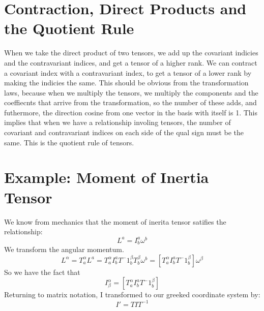 \documentclass[11pt,notitlepage]{article}
\begin{document}
\section{Contraction, Direct Products and the Quotient Rule}
When we take the direct product of two tensors, we add up the covariant indicies and the contravariant indices, and get a tensor of a higher rank. We can contract a covariant index with a contravariant index, to get a tensor of a lower rank by making the indicies the same. This should be obvious from the transformation laws, because when we multiply the tensors, we multiply the components and the coeffiecnts that arrive from the transformation, so the number of these adds, and futhermore, the direction cosine from one vector in the basis with itself is 1. 
This implies that when we have a relationship involing tensors, the number of covariant and contravariant indices on each side of the qual sign must be the same. This is the quotient rule of tensors.
\section{Example: Moment of Inertia Tensor}
We know from mechanics that the moment of inerita tensor satifies the relationship:
$$ L^a = I^a_b \omega^b $$
We transform the angular momentum. 
$$ L^\alpha = T^\alpha_a L^a = T^\alpha_a I^a_b T^-1^\beta_bT^\beta_b\omega^b = \left[T^\alpha_a I^a_b T^-1^\beta_b\right]\omega^\beta$$
So we have the fact that $$I^\alpha_\beta = \left[T^\alpha_a I^a_b T^-1^\beta_b\right]$$
Returning to matrix notation, I transformed to our greeked coordinate system by:
$$I' = T I T^{-1}$$
\end{document}
